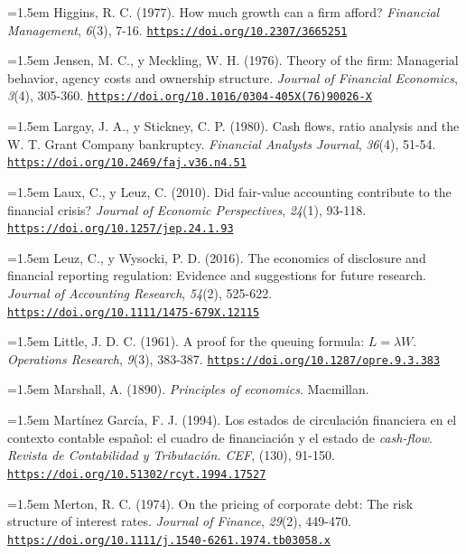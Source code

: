 \documentclass[10pt,a4paper]{article}
\begin{document}
\noindent\hangindent=1.5em Higgins, R. C. (1977). How much growth can a firm afford? \textit{Financial Management}, \textit{6}(3), 7-16. \href{https://doi.org/10.2307/3665251}{\nolinkurl{https://doi.org/10.2307/3665251}}

\noindent\hangindent=1.5em Jensen, M. C., y Meckling, W. H. (1976). Theory of the firm: Managerial behavior, agency costs and ownership structure. \textit{Journal of Financial Economics}, \textit{3}(4), 305-360. \href{https://doi.org/10.1016/0304-405X(76)90026-X}{\nolinkurl{https://doi.org/10.1016/0304-405X(76)90026-X}}

\noindent\hangindent=1.5em Largay, J. A., y Stickney, C. P. (1980). Cash flows, ratio analysis and the W. T. Grant Company bankruptcy. \textit{Financial Analysts Journal}, \textit{36}(4), 51-54. \href{https://doi.org/10.2469/faj.v36.n4.51}{\nolinkurl{https://doi.org/10.2469/faj.v36.n4.51}}

\noindent\hangindent=1.5em Laux, C., y Leuz, C. (2010). Did fair-value accounting contribute to the financial crisis? \textit{Journal of Economic Perspectives}, \textit{24}(1), 93-118. \href{https://doi.org/10.1257/jep.24.1.93}{\nolinkurl{https://doi.org/10.1257/jep.24.1.93}}

\noindent\hangindent=1.5em Leuz, C., y Wysocki, P. D. (2016). The economics of disclosure and financial reporting regulation: Evidence and suggestions for future research. \textit{Journal of Accounting Research}, \textit{54}(2), 525-622. \href{https://doi.org/10.1111/1475-679X.12115}{\nolinkurl{https://doi.org/10.1111/1475-679X.12115}}

\noindent\hangindent=1.5em Little, J. D. C. (1961). A proof for the queuing formula: $L=\lambda W$. \textit{Operations Research}, \textit{9}(3), 383-387. \href{https://doi.org/10.1287/opre.9.3.383}{\nolinkurl{https://doi.org/10.1287/opre.9.3.383}}

\noindent\hangindent=1.5em Marshall, A. (1890). \textit{Principles of economics}. Macmillan.

\noindent\hangindent=1.5em Martínez García, F. J. (1994). Los estados de circulación financiera en el contexto contable español: el cuadro de financiación y el estado de \textit{cash-flow}. \textit{Revista de Contabilidad y Tributación. CEF}, (130), 91-150. \href{https://doi.org/10.51302/rcyt.1994.17527}{\nolinkurl{https://doi.org/10.51302/rcyt.1994.17527}}

\noindent\hangindent=1.5em Merton, R. C. (1974). On the pricing of corporate debt: The risk structure of interest rates. \textit{Journal of Finance}, \textit{29}(2), 449-470. \href{https://doi.org/10.1111/j.1540-6261.1974.tb03058.x}{\nolinkurl{https://doi.org/10.1111/j.1540-6261.1974.tb03058.x}}
\end{document}
